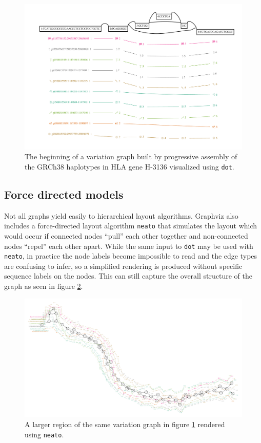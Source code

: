 \begin{figure}[htbp!] 
\centering    
\includegraphics[width=1.0\textwidth]{Chapter2/Figs/vg_view_dp_H-3136_dot.pdf}
\caption[Hierarchical visualization with Graphviz's {\tt dot}]{The beginning of a variation graph built by progressive assembly of the GRCh38 haplotypes in HLA gene H-3136 visualized using {\tt dot}.}
\label{fig:vg_view_dot}
\end{figure}

\subsection{Force directed models}

Not all graphs yield easily to hierarchical layout algorithms.
Graphviz also includes a force-directed layout algorithm {\tt neato} that simulates the layout which would occur if connected nodes ``pull'' each other together and non-connected nodes ``repel'' each other apart.
While the same input to {\tt dot} may be used with {\tt neato}, in practice the node labels become impossible to read and the edge types are confusing to infer, so a simplified rendering is produced without specific sequence labels on the nodes.
This can still capture the overall structure of the graph as seen in figure \ref{fig:vg_view_neato}.

\begin{figure}[htbp!] 
\centering    
\includegraphics[width=1.0\textwidth]{Chapter2/Figs/vg_view_dpS_H-3136_neato.pdf}
\caption[Force-directed layout with Graphviz's {\tt neato}]{A larger region of the same variation graph in figure \ref{fig:vg_view_dot} rendered using {\tt neato}.}
\label{fig:vg_view_neato}
\end{figure}

